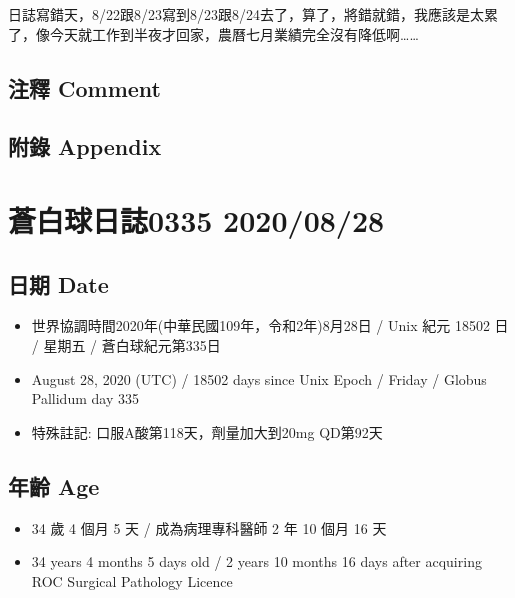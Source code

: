 \documentclass[a5paper, 11pt
]{book}
\providecommand{\tightlist}{%
  \setlength{\itemsep}{0pt}\setlength{\parskip}{0pt}}
\begin{document}
日誌寫錯天，8/22跟8/23寫到8/23跟8/24去了，算了，將錯就錯，我應該是太累了，像今天就工作到半夜才回家，農曆七月業績完全沒有降低啊\ldots\ldots{}

\hypertarget{ux6ce8ux91cb-comment-73}{%
\subsection{注釋 Comment}\label{ux6ce8ux91cb-comment-73}}

\hypertarget{ux9644ux9304-appendix-73}{%
\subsection{附錄 Appendix}\label{ux9644ux9304-appendix-73}}

\hypertarget{ux84bcux767dux7403ux65e5ux8a8c0335-20200828}{%
\section{蒼白球日誌0335
2020/08/28}\label{ux84bcux767dux7403ux65e5ux8a8c0335-20200828}}

\hypertarget{ux65e5ux671f-date-74}{%
\subsection{日期 Date}\label{ux65e5ux671f-date-74}}

\begin{itemize}
\tightlist
\item
  世界協調時間2020年(中華民國109年，令和2年)8月28日 / Unix 紀元 18502 日
  / 星期五 / 蒼白球紀元第335日
\item
  August 28, 2020 (UTC) / 18502 days since Unix Epoch / Friday / Globus
  Pallidum day 335
\item
  特殊註記: 口服A酸第118天，劑量加大到20mg QD第92天
\end{itemize}

\hypertarget{ux5e74ux9f61-age-74}{%
\subsection{年齡 Age}\label{ux5e74ux9f61-age-74}}

\begin{itemize}
\tightlist
\item
  34 歲 4 個月 5 天 / 成為病理專科醫師 2 年 10 個月 16 天
\item
  34 years 4 months 5 days old / 2 years 10 months 16 days after
  acquiring ROC Surgical Pathology Licence
\end{itemize}
\end{document}
